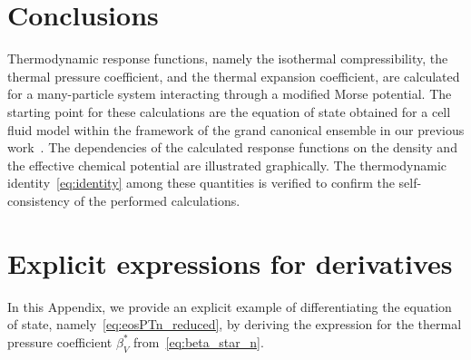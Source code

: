 
\section{Conclusions}
Thermodynamic response functions, namely the isothermal compressibility, the thermal pressure coefficient, and the thermal expansion coefficient, are calculated for a many-particle system interacting through a modified Morse potential. The starting point for these calculations are the equation of state obtained for a cell fluid model within the framework of the grand canonical ensemble in our previous work~\cite{KozlovskiiDobush2020}. The dependencies of the calculated response functions on the density and the effective chemical potential are illustrated graphically. The thermodynamic identity~\eqref{eq:identity} among these quantities is verified to confirm the self-consistency of the performed calculations.

\appendix
\renewcommand{\theequation}{A.\arabic{equation}}
\setcounter{equation}{0}

\section{\label{sec:app-a} Explicit expressions for derivatives}
In this Appendix, we provide an explicit example of differentiating the equation of state, namely~\eqref{eq:eosPTn_reduced}, by deriving the expression for the thermal pressure coefficient $\beta^*_V$ from~\eqref{eq:beta_star_n}.

